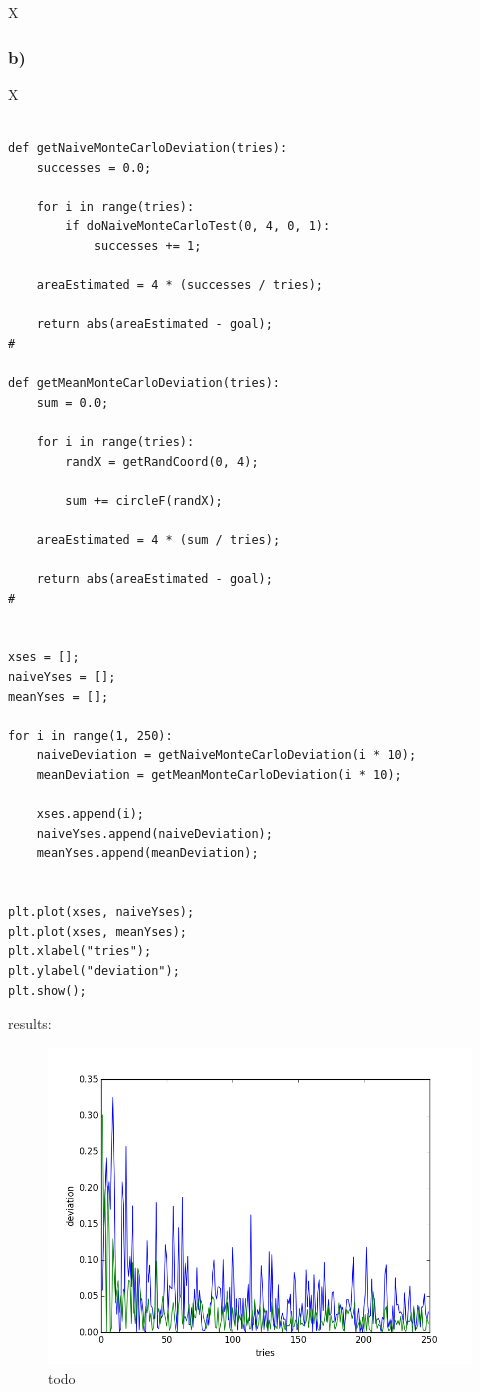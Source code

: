 X



\subsubsection{b)}

X

\begin{lstlisting}[caption=todo]

def getNaiveMonteCarloDeviation(tries):
	successes = 0.0;
	
	for i in range(tries):
		if doNaiveMonteCarloTest(0, 4, 0, 1):
			successes += 1;
	
	areaEstimated = 4 * (successes / tries);
	
	return abs(areaEstimated - goal);
#

def getMeanMonteCarloDeviation(tries):
	sum = 0.0;
	
	for i in range(tries):
		randX = getRandCoord(0, 4);
		
		sum += circleF(randX);
	
	areaEstimated = 4 * (sum / tries);
	
	return abs(areaEstimated - goal);
#


xses = [];
naiveYses = [];
meanYses = [];

for i in range(1, 250):
	naiveDeviation = getNaiveMonteCarloDeviation(i * 10);
	meanDeviation = getMeanMonteCarloDeviation(i * 10);
	
	xses.append(i);
	naiveYses.append(naiveDeviation);
	meanYses.append(meanDeviation);


plt.plot(xses, naiveYses);
plt.plot(xses, meanYses);
plt.xlabel("tries");
plt.ylabel("deviation");
plt.show();

\end{lstlisting}


results:


\begin{figure}[!ht]
\includegraphics[width=1\textwidth]{chapters/images/figure-7-12-b}
\caption{todo}
\end{figure}


